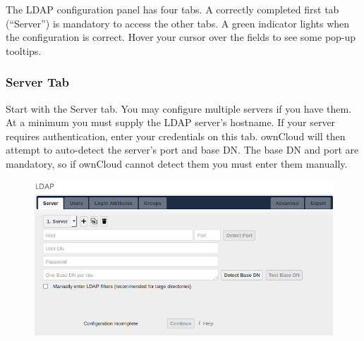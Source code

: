 \documentclass[letterpaper,10pt,english]{sphinxmanual}
\begin{document}
The LDAP configuration panel has four tabs. A correctly completed first tab
(``Server'') is mandatory to access the other tabs. A green indicator lights when
the configuration is correct. Hover your cursor over the fields to see some
pop-up tooltips.


\subsubsection{Server Tab}
\label{configuration_user/user_auth_ldap:server-tab}
Start with the Server tab. You may configure multiple servers if you have them.
At a minimum you must supply the LDAP server's hostname. If your server requires
authentication, enter your credentials on this tab. ownCloud will then attempt
to auto-detect the server's port and base DN. The base DN and port are
mandatory, so if ownCloud cannot detect them you must enter them manually.
\begin{figure}[htbp]
\centering

\includegraphics{ldap-wizard-1-server.png}
\end{figure}
\end{document}
